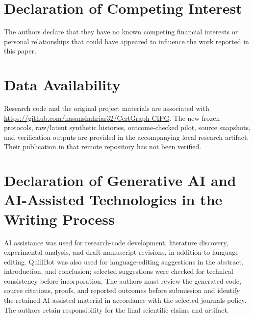 \section*{Declaration of Competing Interest}
\noindent The authors declare that they have no known competing financial interests or personal relationships that could have appeared to influence the work reported in this paper.

\section*{Data Availability}
\noindent Research code and the original project materials are associated with \url{https://github.com/hasanshahriar32/CertGraph-CIPG}. The new frozen protocols, raw/latent synthetic histories, outcome-checked pilot, source snapshots, and verification outputs are provided in the accompanying local research artifact. Their publication in that remote repository has not been verified.

\section*{Declaration of Generative AI and AI-Assisted Technologies in the Writing Process}
\noindent AI assistance was used for research-code development, literature discovery, experimental analysis, and draft manuscript revisions, in addition to language editing. QuillBot was also used for language-editing suggestions in the abstract, introduction, and conclusion; selected suggestions were checked for technical consistency before incorporation. The authors must review the generated code, source citations, proofs, and reported outcomes before submission and identify the retained AI-assisted material in accordance with the selected journal\textquotesingle s policy. The authors retain responsibility for the final scientific claims and artifact.
